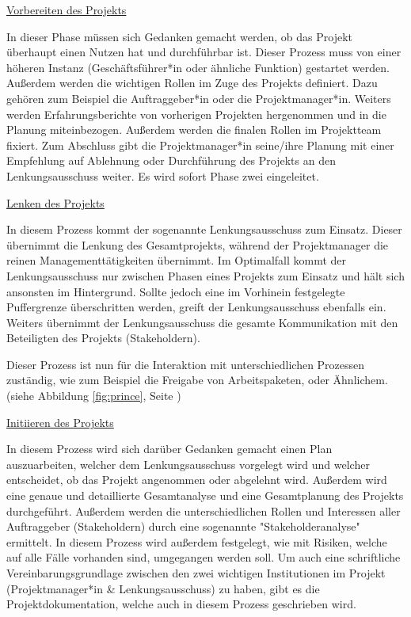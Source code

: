 \underline{Vorbereiten des Projekts}

In dieser Phase müssen sich Gedanken gemacht werden, ob das Projekt überhaupt einen Nutzen hat und durchführbar ist. Dieser Prozess muss von einer höheren Instanz (Geschäftsführer*in oder ähnliche Funktion) gestartet werden. Außerdem werden die wichtigen Rollen im Zuge des Projekts definiert. Dazu gehören zum Beispiel die Auftraggeber*in oder die Projektmanager*in. Weiters werden Erfahrungsberichte von vorherigen Projekten hergenommen und in die Planung miteinbezogen. Außerdem werden die finalen Rollen im Projektteam fixiert. Zum Abschluss gibt die Projektmanager*in seine/ihre Planung mit einer Empfehlung auf Ablehnung oder Durchführung des Projekts an den Lenkungsausschuss weiter. Es wird sofort Phase zwei eingeleitet. \cite{Prince2}

\underline{Lenken des Projekts}

In diesem Prozess kommt der sogenannte Lenkungsausschuss zum Einsatz. Dieser übernimmt die Lenkung des Gesamtprojekts, während der Projektmanager die reinen Managementtätigkeiten übernimmt. Im Optimalfall kommt der Lenkungsausschuss nur zwischen Phasen eines Projekts zum Einsatz und hält sich ansonsten im Hintergrund. Sollte jedoch eine im Vorhinein festgelegte Puffergrenze überschritten werden, greift der Lenkungsausschuss ebenfalls ein. Weiters übernimmt der Lenkungsausschuss die gesamte Kommunikation mit den Beteiligten des Projekts (Stakeholdern). \cite{Prince2}

Dieser Prozess ist nun für die Interaktion mit unterschiedlichen Prozessen zuständig, wie zum Beispiel die Freigabe von Arbeitspaketen, oder Ähnlichem. (siehe Abbildung \ref{fig:prince}, Seite \pageref{fig:prince}) \cite{Prince2}

\underline{Initiieren des Projekts}

In diesem Prozess wird sich darüber Gedanken gemacht einen Plan auszuarbeiten, welcher dem Lenkungsausschuss vorgelegt wird und welcher entscheidet, ob das Projekt angenommen oder abgelehnt wird. Außerdem wird eine genaue und detaillierte Gesamtanalyse und eine Gesamtplanung des Projekts durchgeführt. Außerdem werden die unterschiedlichen Rollen und Interessen aller Auftraggeber (Stakeholdern) durch eine sogenannte "Stakeholderanalyse" ermittelt. In diesem Prozess wird außerdem festgelegt, wie mit Risiken, welche auf alle Fälle vorhanden sind, umgegangen werden soll. Um auch eine schriftliche Vereinbarungsgrundlage zwischen den zwei wichtigen Institutionen im Projekt (Projektmanager*in \& Lenkungsausschuss) zu haben, gibt es die Projektdokumentation, welche auch in diesem Prozess geschrieben wird. \cite{Prince2} \cite{Stakeholder}

